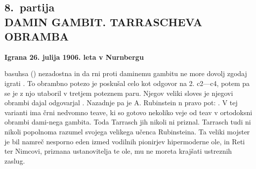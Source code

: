 \message{ !name(longmoves.tex)}\documentclass[11pt,a4paper]{book}
\begin{document}

\pagestyle{headings}

\styleC

\chapter*{}

\section*{8.\ partija\\
DAMIN GAMBIT. TARRASCHEVA OBRAMBA}
{\tiny\bf Igrana 26. julija 1906. leta v Nurnbergu}

\newgame\longmoves
{}
%

basuhsa 
()
nezadostna in da rni proti daminemu
gambitu ne more dovolj zgodaj igrati . To obrambno potezo je poskušal celo kot odgovor na 2. c2—c4, potem pa se je z njo utaboril
v tretjem poteznem paru. Njegov veliki sloves je njegovi obrambi dajal 
odgovarjal
.
Nazadnje pa je A. Rubinstein n pravo pot:
.
V tej varianti ima črni nedvomno teave, ki so gotovo nekoliko veje od teav v
ortodoksni obrambi dami-nega gambita. Toda Tarrasch jih nikoli ni priznal. Tarrasch tudi ni nikoli popolnoma razumel svojega velikega
učenca Rubinsteina. Ta veliki mojster je bil namreč nesporno eden izmed vodilnih pionirjev hipermoderne ole, in Reti ter Nimcovi,
priznana ustanovitelja te ole, mu ne moreta krajšati ustreznih zaslug.
\end{document}
